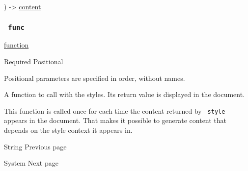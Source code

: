) -\textgreater{} \href{/docs/reference/foundations/content/}{content}

\subsubsection{\texorpdfstring{\texttt{\ func\ }}{ func }}\label{parameters-func}

\href{/docs/reference/foundations/function/}{function}

{Required} {{ Positional }}

\label{parameters-func-positional-tooltip}
Positional parameters are specified in order, without names.

A function to call with the styles. Its return value is displayed in the
document.

This function is called once for each time the content returned by
\texttt{\ style\ } appears in the document. That makes it possible to
generate content that depends on the style context it appears in.

\href{/docs/reference/foundations/str/}{\pandocbounded{}}

{ String } { Previous page }

\href{/docs/reference/foundations/sys/}{\pandocbounded{}}

{ System } { Next page }
